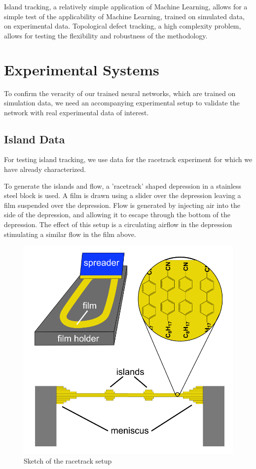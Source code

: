 \documentclass[prl,reprint,showpacs,floatfix,nofootinbib]{revtex4-1}
\begin{document}
Island tracking, a relatively simple application of Machine Learning, allows for a simple test of the applicability of Machine Learning, trained on simulated data, on experimental data. Topological defect tracking, a high complexity problem, allows for testing the flexibility and robustness of the methodology.
%


\section{Experimental Systems}

To confirm the veracity of our trained neural networks, which are trained on simulation data, we need an accompanying experimental setup to validate the network with real experimental data of interest. 

\subsection{Island Data}
For testing island tracking, we use data for the racetrack experiment for which we have already characterized. 

To generate the islands and flow, a 'racetrack' shaped depression in a stainless steel block is used. A film is drawn using a slider over the depression leaving a film suspended over the depression. Flow is generated by injecting air into the side of the depression, and allowing it to escape through the bottom of the depression. The effect of this setup is a circulating airflow in the depression stimulating a similar flow in the film above. 

\begin{figure}
  \includegraphics[width=\linewidth]{racetrack.png}
  \caption{Sketch of the racetrack setup}
  \label{fig:RaceTrackSketch}
\end{figure}
\end{document}
